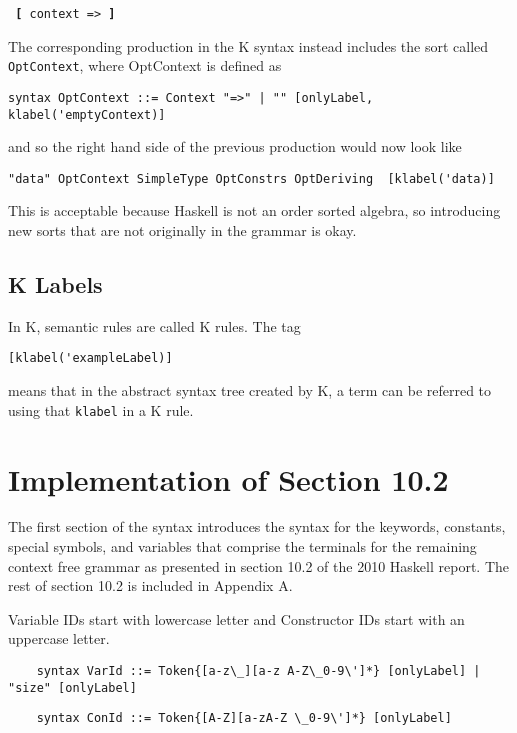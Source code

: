 \texttt{ \textbf{[} context => \textbf{]} }

The corresponding production in the K syntax instead includes the sort called \texttt{OptContext}, where OptContext is defined as

\begin{lstlisting}
syntax OptContext ::= Context "=>" | "" [onlyLabel, klabel('emptyContext)]
\end{lstlisting}

and so the right hand side of the previous production would now look like

\begin{lstlisting}
"data" OptContext SimpleType OptConstrs OptDeriving  [klabel('data)]
\end{lstlisting}

This is acceptable because Haskell is not an order sorted algebra, so introducing new sorts that are not originally in the grammar is okay.

\subsection{K Labels}

In K, semantic rules are called K rules. The tag

\begin{lstlisting}
[klabel('exampleLabel)]
\end{lstlisting}

means that in the abstract syntax tree created by K, a term can be referred to using that \texttt{klabel} in a K rule.

\section{Implementation of Section 10.2}
The first section of the syntax introduces the syntax for the keywords, constants, special symbols, and variables that comprise the terminals for the remaining context free grammar as presented in section 10.2 of the 2010 Haskell report. The rest of section 10.2 is included in Appendix A.

Variable IDs start with lowercase letter and Constructor IDs start with an uppercase letter.

\begin{lstlisting}
    syntax VarId ::= Token{[a-z\_][a-z A-Z\_0-9\']*} [onlyLabel] | "size" [onlyLabel]
\end{lstlisting}
\begin{lstlisting}
    syntax ConId ::= Token{[A-Z][a-zA-Z \_0-9\']*} [onlyLabel]
\end{lstlisting}

